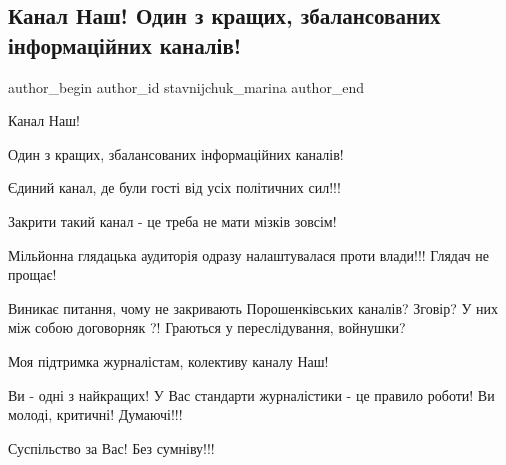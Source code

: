  
 
 
 
 
 
\subsection{Канал Наш! Один з кращих, збалансованих інформаційних каналів!}
\label{sec:12_02_2022.fb.stavnijchuk_marina.1.kanal_nash}
 
\ifcmt
 author_begin
   author_id stavnijchuk_marina
 author_end
\fi

Канал Наш! 

Один з кращих, збалансованих інформаційних каналів! 

Єдиний канал, де були гості від усіх політичних сил!!! 

Закрити такий канал - це треба не мати мізків зовсім! 

Мільйонна глядацька аудиторія одразу налаштувалася проти влади!!! Глядач не
прощає!  

Виникає питання, чому не закривають Порошенківських каналів? Зговір? У них між
собою договорняк ?! Граються у переслідування, войнушки? 

Моя підтримка  журналістам, колективу каналу Наш! 

Ви - одні з найкращих! У Вас стандарти журналістики - це правило роботи! Ви
молоді, критичні! Думаючі!!! 

Суспільство за Вас! Без сумніву!!!

